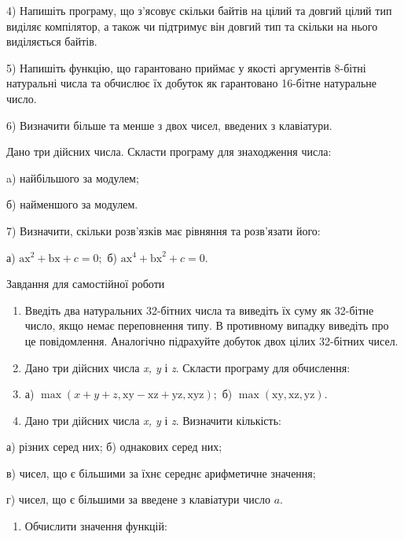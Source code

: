 \documentclass[]{article}
\begin{document}
4) Напишіть програму, що з'ясовує скільки байтів на цілий та довгий
цілий тип виділяє компілятор, а також чи підтримує він довгий тип та
скільки на нього виділяється байтів.

5) Напишіть функцію, що гарантовано приймає у якості аргументів 8-бітні
натуральні числа та обчислює їх добуток як гарантовано 16-бітне
натуральне число.

6) Визначити більше та менше з двох чисел, введених з клавіатури.

Дано три дійсних числа. Скласти програму для знаходження числа:

a) найбільшого за модулем;

б) найменшого за модулем.

7) Визначити, скільки розв'язків має рівняння та розв'язати його:

а) \(\mathrm{\text{ax}}^{2} + \mathrm{\text{bx}} + c = 0;\) б)
\(\mathrm{\text{ax}}^{4} + \mathrm{\text{bx}}^{2} + c = 0\mathrm{.}\)

Завдання для самостійної роботи

\begin{enumerate}
\def\labelenumi{\arabic{enumi})}
\setcounter{enumi}{7}
\item
  Введіть два натуральних 32-бітних числа та виведіть їх суму як
  32-бітне число, якщо немає переповнення типу. В противному випадку
  виведіть про це повідомлення. Аналогічно підрахуйте добуток двох цілих
  32-бітних чисел.
\item
  Дано три дійсних числа \emph{x, y} і \emph{z}. Скласти програму для
  обчислення:
\item
  а)
  \(\mathrm{\max}(x + y + z,\mathrm{\text{xy}} - \mathrm{\text{xz}} + \mathrm{\text{yz}},\mathrm{\text{xyz}});\)
  б)
  \(\mathrm{\max}(\mathrm{\text{xy}},\mathrm{\text{xz}},\mathrm{\text{yz}})\mathrm{.}\)
\item
  Дано три дійсних числа \emph{x, y} і \emph{z}. Визначити кількість:
\end{enumerate}

а) різних серед них; б) однакових серед них;

в) чисел, що є більшими за їхнє середнє арифметичне значення;

г) чисел, що є більшими за введене з клавіатури число \(a\).

\begin{enumerate}
\def\labelenumi{\arabic{enumi})}
\setcounter{enumi}{7}
\item
  Обчислити значення функцій:
\end{enumerate}
\end{document}
